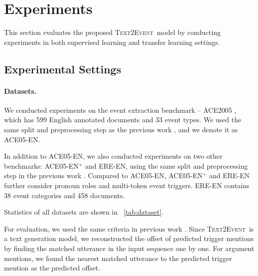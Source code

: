 \documentclass[11pt,a4paper]{article}
\newcommand\modelname{\textsc{Text2Event}}
\begin{document}
\section{Experiments} \label{sec:experiment}

This section evaluates the proposed \modelname\, model by conducting experiments in both supervised learning and transfer learning settings.

\subsection{Experimental Settings} \label{sec:exp_settings}

\paragraph{Datasets.}
We conducted experiments on the event extraction benchmark -- ACE2005 \citep{ace2005-annotation}, which has 599 English annotated documents and 33 event types.
We used the same split and preprocessing step as the previous work \citep{Zhang:2019:GAIL,wadden-etal-2019-entity,du-cardie-2020-event}, and we denote it as ACE05-EN.

In addition to ACE05-EN, we also conducted experiments on two other benchmarks: ACE05-EN$^+$ and ERE-EN, using the same split and preprocessing step in the previous work \citep{lin-etal-2020-joint}.
Compared to ACE05-EN, ACE05-EN$^+$ and ERE-EN further consider pronoun roles and multi-token event triggers.
ERE-EN contains 38 event categories and 458 documents.

Statistics of all datasets are shown in \tablename~\ref{tab:dataset}.

For evaluation, we used the same criteria in previous work \citep{Zhang:2019:GAIL,wadden-etal-2019-entity,lin-etal-2020-joint}.
Since \modelname\, is a text generation model, we reconstructed the offset of predicted trigger mentions by finding the matched utterance in the input sequence one by one.
For argument mentions, we found the nearest matched utterance to the predicted trigger mention as the predicted offset.
\end{document}
